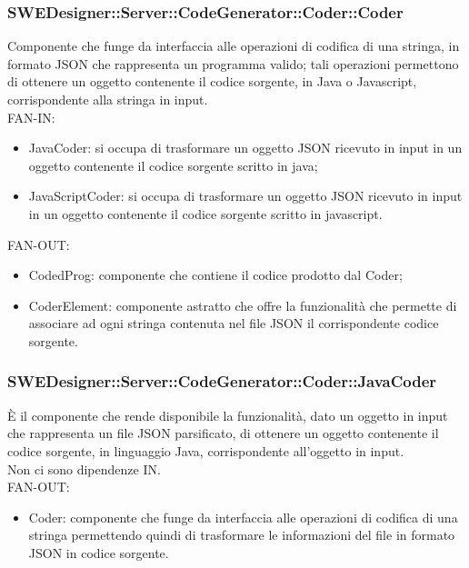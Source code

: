 \documentclass[../DefinizioneDiProdotto.tex]{subfiles}
\begin{document}
				\subsubsection{SWEDesigner::Server::CodeGenerator::Coder::Coder}
				Componente che funge da interfaccia alle operazioni di codifica di una stringa, in formato JSON che rappresenta un programma valido; tali operazioni permettono di ottenere un oggetto contenente il codice sorgente, in Java o Javascript, corrispondente alla stringa in input.\\
					FAN-IN:
					\begin{itemize}
						\item JavaCoder: si occupa di trasformare un oggetto JSON ricevuto in input in un oggetto contenente il codice sorgente scritto in java;
						\item JavaScriptCoder: si occupa di trasformare un oggetto JSON ricevuto in input in un oggetto contenente il codice sorgente scritto in javascript.
					\end{itemize}
					FAN-OUT:
					\begin{itemize}
						\item CodedProg: componente che contiene il codice prodotto dal Coder;
						\item CoderElement: componente astratto che offre la funzionalità che permette di associare ad ogni stringa contenuta nel file JSON il corrispondente codice sorgente.
					\end{itemize}

				\subsubsection{SWEDesigner::Server::CodeGenerator::Coder::JavaCoder}
				È il componente che rende disponibile la funzionalità, dato un oggetto in input che rappresenta un file JSON parsificato, di ottenere un oggetto contenente il codice sorgente, in linguaggio Java, corrispondente all'oggetto in input.\\
					Non ci sono dipendenze IN.\\
					FAN-OUT:
					\begin{itemize}
						\item Coder: componente che funge da interfaccia alle operazioni di codifica di una stringa permettendo quindi di trasformare le informazioni del file in formato JSON in codice sorgente.
					\end{itemize}
\end{document}
